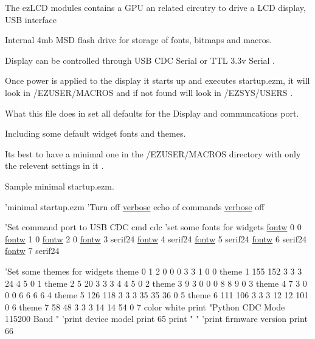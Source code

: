 The ez\-L\-C\-D modules contains a G\-P\-U an related circutry to drive a L\-C\-D display, U\-S\-B interface \par
 Internal 4mb M\-S\-D flash drive for storage of fonts, bitmaps and macros.\par
 Display can be controlled through U\-S\-B C\-D\-C Serial or T\-T\-L 3.\-3v Serial .\par
 \par
 Once power is applied to the display it starts up and executes startup.\-ezm, it will look in /\-E\-Z\-U\-S\-E\-R/\-M\-A\-C\-R\-O\-S and if not found will look in /\-E\-Z\-S\-Y\-S/\-U\-S\-E\-R\-S .\par
 What this file does in set all defaults for the Display and communcations port.\par
 Including some default widget fonts and themes. \par
 Its best to have a minimal one in the /\-E\-Z\-U\-S\-E\-R/\-M\-A\-C\-R\-O\-S directory with only the relevent settings in it . \par
 \par
 Sample minimal startup.\-ezm. 
\begin{DoxyCodeInclude}
\textcolor{stringliteral}{'minimal startup.ezm}
\textcolor{stringliteral}{}
\textcolor{stringliteral}{'}Turn off \hyperlink{group___general_ga350c2e1be0d3d074d79d7a7278c44a22}{verbose} echo of commands
\hyperlink{group___general_ga350c2e1be0d3d074d79d7a7278c44a22}{verbose} off

\textcolor{stringliteral}{'Set command port to USB CDC}
\textcolor{stringliteral}{cmd cdc}
\textcolor{stringliteral}{}
\textcolor{stringliteral}{'}\textcolor{keyword}{set} some fonts \textcolor{keywordflow}{for} widgets
\hyperlink{group___widgets_ga0efc2d431900e2b77a30e19bb556fb3a}{fontw} 0 0
\hyperlink{group___widgets_ga0efc2d431900e2b77a30e19bb556fb3a}{fontw} 1 0
\hyperlink{group___widgets_ga0efc2d431900e2b77a30e19bb556fb3a}{fontw} 2 0
\hyperlink{group___widgets_ga0efc2d431900e2b77a30e19bb556fb3a}{fontw} 3 serif24
\hyperlink{group___widgets_ga0efc2d431900e2b77a30e19bb556fb3a}{fontw} 4 serif24
\hyperlink{group___widgets_ga0efc2d431900e2b77a30e19bb556fb3a}{fontw} 5 serif24
\hyperlink{group___widgets_ga0efc2d431900e2b77a30e19bb556fb3a}{fontw} 6 serif24
\hyperlink{group___widgets_ga0efc2d431900e2b77a30e19bb556fb3a}{fontw} 7 serif24

\textcolor{stringliteral}{'Set some themes for widgets}
\textcolor{stringliteral}{theme 0   1   2 0 0 0  3  3   1 0 0}
\textcolor{stringliteral}{theme 1 155 152 3 3 3  24  4   5 0 1}
\textcolor{stringliteral}{theme 2   5  20 3 3 3  4  4   5 0 2}
\textcolor{stringliteral}{theme 3   9   3 0 0 0  8  8   9 0 3}
\textcolor{stringliteral}{theme 4   7   3 0 0 0  6  6   6 6 4}
\textcolor{stringliteral}{theme 5 126 118 3 3 3 35 35  36 0 5}
\textcolor{stringliteral}{theme 6 111 106 3 3 3 12 12 101 0 6}
\textcolor{stringliteral}{theme 7  58  48 3 3 3 14 14  54 0 7}
\textcolor{stringliteral}{}
\textcolor{stringliteral}{color white}
\textcolor{stringliteral}{print "Python CDC Mode 115200 Baud  "}
\textcolor{stringliteral}{'}print device model
print 65
print \textcolor{stringliteral}{"  "}
\textcolor{stringliteral}{'print firmware version}
\textcolor{stringliteral}{print 66}
\end{DoxyCodeInclude}
